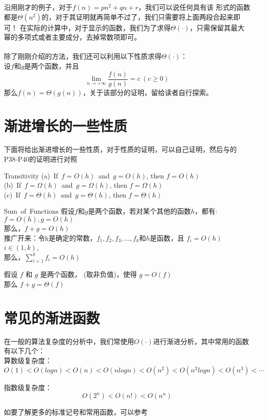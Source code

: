 沿用刚才的例子，对于$f(n)=pn^2+qn+r$，我们可以说任何具有该
形式的函数都是$\Theta(n^2)$的，对于其证明就再简单不过了，我们只需要将上面两段合起来即可！
在实际的计算中，对于显示的函数，我们为了求得$\Theta(\cdot)$，只需保留其最大幂的多项式或者主要成分，去掉常数项即可。
\\
\\
除了刚刚介绍的方法，我们还可以利用以下性质求得$\Theta(\cdot)$：
\\
设$f$和$g$是两个函数，并且
\[
	\lim_{n\rightarrow+\infty}\frac{f(n)}{g(n)} = c \ (c\ge 0)
\]
那么$f(n)=\Theta(g(n))$，关于该部分的证明，留给读者自行探索。


\section{渐进增长的一些性质}
下面将给出渐进增长的一些性质，对于性质的证明，可以自己证明，然后与\cite{textbook1}的P38-P40的证明进行对照
\begin{theorem}{Transitivity}{}
	(a)\ If\ $f=O(h)$\ and\ $g=O(h)$, then $f=O(h)$\\
	(b)\ If\ $f=\Omega(h)$\ and\ $g=\Omega(h)$, then $f=\Omega(h)$\\
	(c)\ If\ $f=\Theta(h)$\ and\ $g=\Theta(h)$, then $f=\Theta(h)$
\end{theorem}

\begin{theorem}{Sum\ of\ Functions}{}
	假设$f$和$g$是两个函数，若对某个其他的函数$h$，都有:$f=O(h),g=O(h)$\\
	那么，$f+g=O(h)$\\
	推广开来：令k是确定的常数，$f_1,f_2,f_3,\ldots,f_k$和$h$是函数，且
	$f_i=O(h)$ \ \ $i\in (1,k)$,\\
	那么，$\sum^{k}_{i=1}f_i=O(h)$
\end{theorem}

\begin{theorem}{}{}
	假设 $f$ 和 $g$ 是两个函数， (取非负值)，使得 $g = O(f)$ \\
	那么 $f+g=\Theta(f)$
\end{theorem}

\section{常见的渐进函数}
在一般的算法复杂度的分析中，我们常使用$O(\cdot)$进行渐进分析，其中常用的函数有以下几个：\\
算数级复杂度：
\[
	O(1)<O(logn)<O(n)<O(nlogn)<O(n^2)<O(n^2logn)<O(n^3)< \cdots
\]

指数级复杂度：
\[
	O(2^n)<O(n!)<O(n^n)
\]

如要了解更多的标准记号和常用函数，可以参考~\cite{cormen2009introduction}
